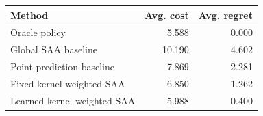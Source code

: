\begin{tabular}{lrr}
\toprule
Method & Avg. cost & Avg. regret \\
\midrule
Oracle policy & 5.588 & 0.000 \\
Global SAA baseline & 10.190 & 4.602 \\
Point-prediction baseline & 7.869 & 2.281 \\
Fixed kernel weighted SAA & 6.850 & 1.262 \\
Learned kernel weighted SAA & 5.988 & 0.400 \\
\bottomrule
\end{tabular}
